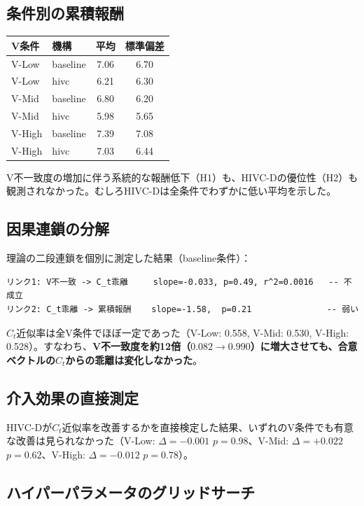 \documentclass[11pt]{ltjsarticle}
\newcommand{\Ct}{\ensuremath{C_t}}
\begin{document}
\subsection{条件別の累積報酬}

\begin{longtable}{@{}l l c c@{}}
\toprule
V条件 & 機構 & 平均 & 標準偏差 \\
\midrule
V-Low  & baseline & 7.06 & 6.70 \\
V-Low  & hivc     & 6.21 & 6.30 \\
V-Mid  & baseline & 6.80 & 6.20 \\
V-Mid  & hivc     & 5.98 & 5.65 \\
V-High & baseline & 7.39 & 7.08 \\
V-High & hivc     & 7.03 & 6.44 \\
\bottomrule
\end{longtable}

V不一致度の増加に伴う系統的な報酬低下（H1）も、HIVC-Dの優位性（H2）も観測されなかった。むしろHIVC-Dは全条件でわずかに低い平均を示した。

\subsection{因果連鎖の分解}

理論の二段連鎖を個別に測定した結果（baseline条件）：

\begin{Verbatim}[frame=single,fontsize=\small]
リンク1: V不一致 -> C_t乖離     slope=-0.033, p=0.49, r^2=0.0016   -- 不成立
リンク2: C_t乖離 -> 累積報酬    slope=-1.58,  p=0.21               -- 弱い
\end{Verbatim}

\Ct{}近似率は全V条件でほぼ一定であった（V-Low: 0.558, V-Mid: 0.530, V-High: 0.528）。すなわち、\textbf{V不一致度を約12倍（$0.082\to0.990$）に増大させても、合意ベクトルの\Ct{}からの乖離は変化しなかった}。

\subsection{介入効果の直接測定}

HIVC-Dが\Ct{}近似率を改善するかを直接検定した結果、いずれのV条件でも有意な改善は見られなかった（V-Low: $\Delta=-0.001$ $p=0.98$、V-Mid: $\Delta=+0.022$ $p=0.62$、V-High: $\Delta=-0.012$ $p=0.78$）。

\subsection{ハイパーパラメータのグリッドサーチ}
\end{document}
